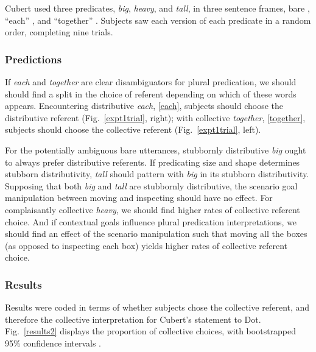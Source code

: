 \documentclass[linguex]{sp}
\begin{document}
 Cubert used three predicates, \emph{big}, \emph{heavy}, and \emph{tall}, in three sentence frames, bare \Last[a], ``each'' \Last[b], and ``together'' \Last[c]. Subjects saw each version of each predicate in a random order, completing nine trials. 

\subsubsection{Predictions}

If \emph{each} and \emph{together} are clear disambiguators for plural predication, we should should find a split in the choice of referent depending on which of these words appears. Encountering distributive \emph{each}, \ref{each}, subjects should choose the distributive referent (Fig.~\ref{expt1trial}, right); with collective \emph{together}, \ref{together}, subjects should choose the collective referent (Fig.~\ref{expt1trial}, left). 

For the potentially ambiguous bare utterances, stubbornly distributive \emph{big} ought to always prefer distributive referents. If predicating size and shape determines stubborn distributivity, \emph{tall} should pattern with \emph{big} in its stubborn distributivity. Supposing that both \emph{big} and \emph{tall} are stubbornly distributive, the scenario goal manipulation between moving and inspecting should have no effect. For complaisantly collective \emph{heavy}, we should find higher rates of collective referent choice. And if contextual goals influence plural predication interpretations, we should find an effect of the scenario manipulation such that moving all the boxes (as opposed to inspecting each box) yields higher rates of collective referent choice.

\subsubsection{Results}

Results were coded in terms of whether subjects chose the collective referent, and therefore the collective interpretation for Cubert's statement to Dot. Fig.\ \ref{results2} displays the proportion of collective choices, with bootstrapped 95\% confidence intervals \citep{diciccioefron1996}.
\end{document}

